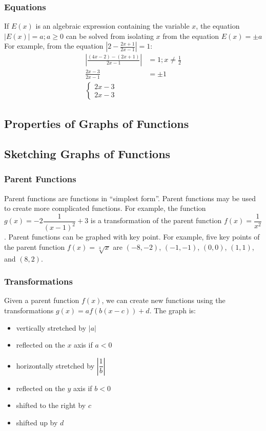 \documentclass{article}
\begin{document}
	\subsubsection{Equations}
	If $E(x)$ is an algebraic expression containing the variable $x$, the equation $|E(x)|=a; a\geq0$ can be solved from isolating $x$ from the equation $E(x)=\pm a$\\
	For example, from the equation $\left|2-\frac{2x+1}{2x-1}\right|=1$:
	\begin{align*}
		\left|\frac{(4x-2)-(2x+1)}{2x-1}\right|&=1;x\neq\frac{1}{2}\\
		\frac{2x-3}{2x-1}&=\pm1\\
		\begin{cases}
			2x-3\\
			2x-3
		\end{cases}&
	\end{align*}
	\subsection{Properties of Graphs of Functions}
	\subsection{Sketching Graphs of Functions}
	\subsubsection{Parent Functions}
	Parent functions are functions in ``simplest form''. Parent functions may be used to create more complicated functions. For example, the function $g(x)=-2\dfrac{1}{(x-1)^2}+3$ is a transformation of the parent function $f(x)=\dfrac{1}{x^2}$. Parent functions can be graphed with key point. For example, five key points of the parent function $f(x)=\sqrt[3]{x}$ are $(-8, -2)$, $(-1, -1)$, $(0, 0)$, $(1, 1)$, and $(8, 2)$.
	\subsubsection{Transformations}
	Given a parent function $f(x)$, we can create new functions using the transformations $g(x)=af(b(x-c))+d$. The graph is:
	\begin{itemize}
		\item vertically stretched by $|a|$
		\item reflected on the $x$ axis if $a<0$
		\item horizontally stretched by $\left|\dfrac{1}{b}\right|$
		\item reflected on the $y$ axis if $b<0$
		\item shifted to the right by $c$
		\item shifted up by $d$
	\end{itemize}
\end{document}
